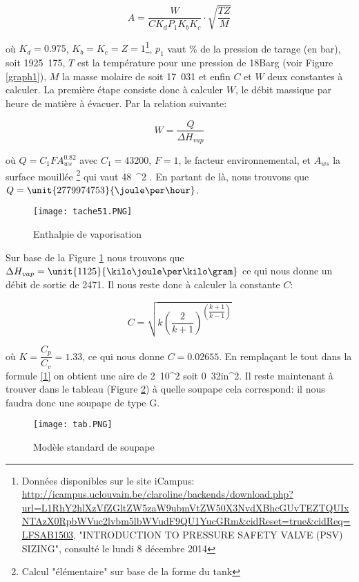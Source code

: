 \begin{equation}
A=\dfrac{W}{CK_dP_1K_bK_c}\cdot \sqrt{\dfrac{TZ}{M}}
\label{1}
\end{equation}

où $K_d=0.975$, $K_b=K_c=Z=1$\footnote{Données disponibles sur le site iCampus: \url{http://icampus.uclouvain.be/claroline/backends/download.php?url=L1RhY2hlXzVfZGltZW5zaW9ubmVtZW50X3NvdXBhcGUvTEZTQUIxNTAzX0RpbWVuc2lvbm5lbWVudF9QU1YucGRm&cidReset=true&cidReq=LFSAB1503}, "INTRODUCTION TO PRESSURE SAFETY VALVE (PSV) SIZING", consulté le lundi 8 décembre 2014}, $p_1$ vaut  \% de la pression de tarage (en bar), soit \unit{1925.175}{\kilo \pascal}, $T$ est la température pour une pression de \unit{18}{Barg} (voir Figure \ref{graph1}), $M$ la masse molaire de  soit \unit{17.031}{\gram \per \mole} et enfin $C$ et $W$ deux constantes à calculer. La première étape consiste donc à calculer $W$, le débit massique par heure de matière à évacuer. Par la relation suivante:

$$W=\dfrac{Q}{\Delta H_{vap}}$$

où $Q=C_1FA_{ws}^{0.82}$ avec $C_1=43200$, $F=1$, le facteur environnemental, et $A_ {ws}$ la surface mouillée \footnote{Calcul "élémentaire" sur base de la forme du tank} qui vaut \unit{48\pi}{\meter ^2} . En partant de là, nous trouvons que $Q=\unit{2779974753}{\joule \per \hour}$.

\begin{figure}[ht!]
\centering
\texttt{[image: tache51.PNG]}
\caption{Enthalpie de vaporisation}
\label{graph2}
\end{figure}

Sur base de la Figure \ref{graph2} nous trouvons que $\Delta H_{vap}=\unit{1125}{\kilo \joule \per \kilo \gram}$ ce qui nous donne un débit de sortie de \unit{2471}{\kilo \gram \per \hour}.
Il nous reste donc à calculer la constante $C$:

$$C=\sqrt{k\left( \dfrac{2}{k+1}\right)^{\left( \dfrac{k+1}{k-1}\right)}}$$

où $K=\dfrac{C_p}{C_v}=1.33$, ce qui nous donne $C=0.02655$. En remplaçant le tout dans la formule \ref{1} on obtient une aire de \unit{2.10}{\centi \metre^2} soit \unit{0.32}{in^2}. Il reste maintenant à trouver dans le tableau (Figure \ref{tab}) à quelle soupape cela correspond: il nous faudra donc une soupape de type G.

\begin{figure}[ht!]
\centering
\texttt{[image: tab.PNG]}
\caption{Modèle standard de soupape}
\label{tab}
\end{figure}

